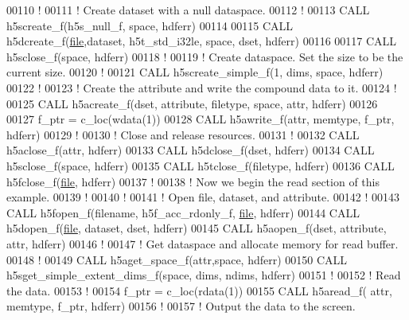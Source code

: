 \begin{DoxyCode}
00110   \textcolor{comment}{!}
00111   \textcolor{comment}{! Create dataset with a null dataspace.}
00112   \textcolor{comment}{!}
00113   \textcolor{keyword}{CALL }h5screate\_f(h5s\_null\_f, space, hdferr)
00114 
00115   \textcolor{keyword}{CALL }h5dcreate\_f(\hyperlink{structfile}{file},dataset, h5t\_std\_i32le, space, dset, hdferr)
00116 
00117   \textcolor{keyword}{CALL }h5sclose\_f(space, hdferr)
00118   \textcolor{comment}{!}
00119   \textcolor{comment}{! Create dataspace.  Set the size to be the current size.}
00120   \textcolor{comment}{!}
00121   \textcolor{keyword}{CALL }h5screate\_simple\_f(1, dims, space, hdferr)
00122   \textcolor{comment}{!}
00123   \textcolor{comment}{! Create the attribute and write the compound data to it.}
00124   \textcolor{comment}{!}
00125   \textcolor{keyword}{CALL }h5acreate\_f(dset, attribute, filetype, space, attr, hdferr)
00126 
00127   f\_ptr = c\_loc(wdata(1))
00128   \textcolor{keyword}{CALL }h5awrite\_f(attr, memtype, f\_ptr, hdferr)
00129   \textcolor{comment}{!}
00130   \textcolor{comment}{! Close and release resources.}
00131   \textcolor{comment}{!}
00132   \textcolor{keyword}{CALL }h5aclose\_f(attr, hdferr)
00133   \textcolor{keyword}{CALL }h5dclose\_f(dset, hdferr)
00134   \textcolor{keyword}{CALL }h5sclose\_f(space, hdferr)
00135   \textcolor{keyword}{CALL }h5tclose\_f(filetype, hdferr)
00136   \textcolor{keyword}{CALL }h5fclose\_f(\hyperlink{structfile}{file}, hdferr)
00137   \textcolor{comment}{!}
00138   \textcolor{comment}{! Now we begin the read section of this example.}
00139   \textcolor{comment}{!}
00140   \textcolor{comment}{!}
00141   \textcolor{comment}{! Open file, dataset, and attribute.}
00142   \textcolor{comment}{!}
00143   \textcolor{keyword}{CALL }h5fopen\_f(filename, h5f\_acc\_rdonly\_f, \hyperlink{structfile}{file}, hdferr)
00144   \textcolor{keyword}{CALL }h5dopen\_f(\hyperlink{structfile}{file}, dataset, dset, hdferr)
00145   \textcolor{keyword}{CALL }h5aopen\_f(dset, attribute, attr, hdferr)
00146   \textcolor{comment}{!}
00147   \textcolor{comment}{! Get dataspace and allocate memory for read buffer.}
00148   \textcolor{comment}{!}
00149   \textcolor{keyword}{CALL }h5aget\_space\_f(attr,space, hdferr)
00150   \textcolor{keyword}{CALL }h5sget\_simple\_extent\_dims\_f(space, dims, ndims, hdferr)
00151   \textcolor{comment}{!}
00152   \textcolor{comment}{! Read the data.}
00153   \textcolor{comment}{!}
00154   f\_ptr = c\_loc(rdata(1))
00155   \textcolor{keyword}{CALL }h5aread\_f( attr, memtype, f\_ptr, hdferr)
00156   \textcolor{comment}{!}
00157   \textcolor{comment}{! Output the data to the screen.}

\end{DoxyCode}
